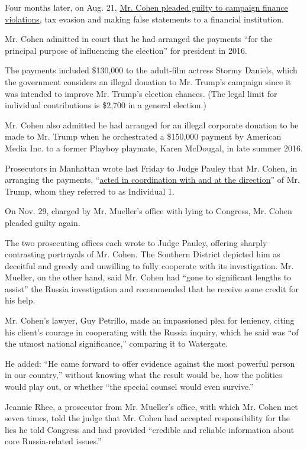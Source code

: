 Four months later, on Aug. 21,
\href{https://www.nytimes.com/2018/08/21/nyregion/michael-cohen-plea-deal-trump.html}{Mr.
Cohen pleaded guilty to campaign finance violations}, tax evasion and
making false statements to a financial institution.

Mr. Cohen admitted in court that he had arranged the payments ``for the
principal purpose of influencing the election'' for president in 2016.

The payments included \$130,000 to the adult-film actress Stormy
Daniels, which the government considers an illegal donation to Mr.
Trump's campaign since it was intended to improve Mr. Trump's election
chances. (The legal limit for individual contributions is \$2,700 in a
general election.)

Mr. Cohen also admitted he had arranged for an illegal corporate
donation to be made to Mr. Trump when he orchestrated a \$150,000
payment by American Media Inc. to a former Playboy playmate, Karen
McDougal, in late summer 2016.

Prosecutors in Manhattan wrote last Friday to Judge Pauley that Mr.
Cohen, in arranging the payments,
``\href{https://www.nytimes.com/2018/12/07/nyregion/michael-cohen-sentence.html}{acted
in coordination with and at the direction}'' of Mr. Trump, whom they
referred to as Individual 1.

On Nov. 29, charged by Mr. Mueller's office with lying to Congress, Mr.
Cohen pleaded guilty again.

The two prosecuting offices each wrote to Judge Pauley, offering sharply
contrasting portrayals of Mr. Cohen. The Southern District depicted him
as deceitful and greedy and unwilling to fully cooperate with its
investigation. Mr. Mueller, on the other hand, said Mr. Cohen had ``gone
to significant lengths to assist'' the Russia investigation and
recommended that he receive some credit for his help.

Mr. Cohen's lawyer, Guy Petrillo, made an impassioned plea for leniency,
citing his client's courage in cooperating with the Russia inquiry,
which he said was ``of the utmost national significance,'' comparing it
to Watergate.

He added: ``He came forward to offer evidence against the most powerful
person in our country,'' without knowing what the result would be, how
the politics would play out, or whether ``the special counsel would even
survive.''

Jeannie Rhee, a prosecutor from Mr. Mueller's office, with which Mr.
Cohen met seven times, told the judge that Mr. Cohen had accepted
responsibility for the lies he told Congress and had provided ``credible
and reliable information about core Russia-related issues.''

